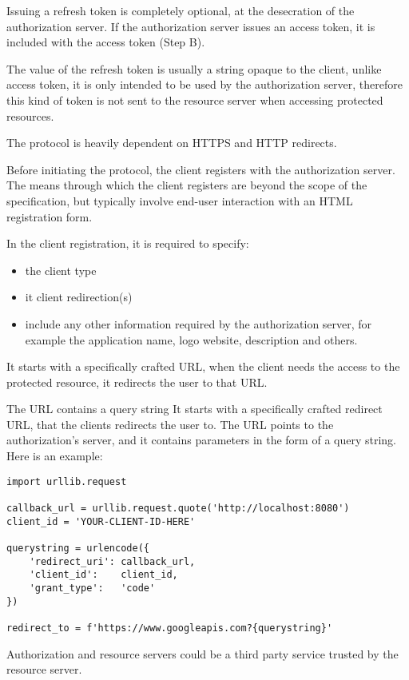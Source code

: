 \documentclass[11pt]{style}
\begin{document}
Issuing a refresh token is completely optional, at the desecration of the
authorization server.
If the authorization server issues an access token, it is included with the
access token (Step B).

The value of the refresh token is usually a string opaque to the client, unlike
access token, it is only intended to be used by the authorization server,
therefore this kind of token is not sent to the resource server when accessing
protected resources.


The protocol is heavily dependent on HTTPS and HTTP redirects.

Before initiating the protocol, the client registers with the authorization
server.
The means through which the client registers are beyond the scope of the
specification, but typically involve end-user interaction with an HTML
registration form.

In the client registration, it is required to specify:
\begin{itemize}
    \item the client type
    \item it client redirection(s)
    \item include any other information required by the authorization server,
        for example the application name, logo website, description and others.
\end{itemize}

It starts with a specifically crafted URL, when the client needs the access to
the protected resource, it redirects the user to that URL.

The URL contains a query string
It starts with a specifically crafted redirect URL, that the clients
redirects the user to.
The URL points to the authorization's server, and it contains parameters in the
form of a query string. Here is an example:

\begin{lstlisting}
import urllib.request

callback_url = urllib.request.quote('http://localhost:8080')
client_id = 'YOUR-CLIENT-ID-HERE'

querystring = urlencode({
    'redirect_uri': callback_url,
    'client_id':    client_id,
    'grant_type':   'code'
})

redirect_to = f'https://www.googleapis.com?{querystring}'
\end{lstlisting}


Authorization and resource servers could be a third party service trusted by the
resource server.
\end{document}
